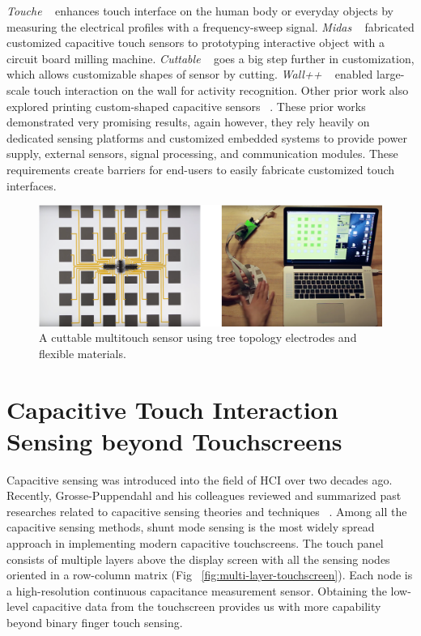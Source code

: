\textit{Touche} ~\cite{Sato-Touche} enhances touch interface on the human body or everyday objects by measuring the electrical profiles with a frequency-sweep signal. \textit{Midas} ~\cite{Savage-2012-Midas} fabricated customized capacitive touch sensors to prototyping interactive object with a circuit board milling machine. \textit{Cuttable} ~\cite{olberding2013cuttable} goes a big step further in customization, which allows customizable shapes of sensor by cutting. \textit{Wall++} ~\cite{Zhang-wall} enabled large-scale touch interaction on the wall for activity recognition. Other prior work also explored printing custom-shaped capacitive sensors ~\cite{gong2014printsense,olberding2015foldio,olberding2014printscreen,vadgama2017flexy}. These prior works demonstrated very promising results, again however, they rely heavily on dedicated sensing platforms and customized embedded systems to provide power supply, external sensors, signal processing, and communication modules. These requirements create barriers for end-users to easily fabricate customized touch interfaces.

\begin{figure}[ht]
    \centering
	\includegraphics[width=0.88\columnwidth]{figures/cuttable.png}
	\setlength{\belowcaptionskip}{-6pt}
    \caption{A cuttable multitouch sensor using tree topology electrodes and flexible materials.}
    \label{fig:cuttable}
\end{figure}



\section{Capacitive Touch Interaction Sensing beyond Touchscreens}
Capacitive sensing was introduced into the field of HCI over two decades ago. Recently, Grosse-Puppendahl and his colleagues reviewed and summarized past researches related to capacitive sensing theories and techniques ~\cite{Grosse-Puppendahl-capacitive}. Among all the capacitive sensing methods, shunt mode sensing is the most widely spread approach in implementing modern capacitive touchscreens. The touch panel consists of multiple layers above the display screen with all the sensing nodes oriented in a row-column matrix (Fig ~\ref{fig:multi-layer-touchscreen}). Each node is a high-resolution continuous capacitance measurement sensor. Obtaining the low-level capacitive data from the touchscreen provides us with more capability beyond binary finger touch sensing. 

